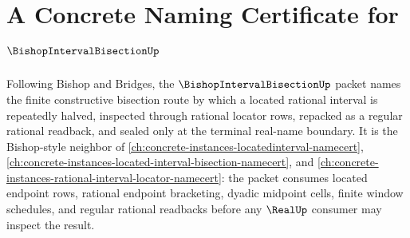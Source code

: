 \chapter{A Concrete Naming Certificate for $\BishopIntervalBisectionUp$}
\label{ch:concrete-instances-bishop-interval-bisection-namecert}

Following Bishop and Bridges, the $\BishopIntervalBisectionUp$ packet names the finite constructive bisection route by which a located rational interval is repeatedly halved, inspected through rational locator rows, repacked as a regular rational readback, and sealed only at the terminal real-name boundary. It is the Bishop-style neighbor of \autoref{ch:concrete-instances-locatedinterval-namecert}, \autoref{ch:concrete-instances-located-interval-bisection-namecert}, and \autoref{ch:concrete-instances-rational-interval-locator-namecert}: the packet consumes located endpoint rows, rational endpoint bracketing, dyadic midpoint cells, finite window schedules, and regular rational readbacks before any $\RealUp$ consumer may inspect the result.

